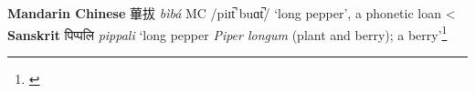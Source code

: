 \begin{etymology}\label{ety:biba}
\textbf{Mandarin Chinese} {蓽拔} \textit{bìbá} MC /piɪt̚  buɑt̚/ `long pepper', a phonetic loan
< \textbf{Sanskrit} {पिप्पलि } \textit{pippali} `long pepper \textit{Piper longum} (plant and berry); a berry'\footnote{\textcite[626]{monier-williams_sanskrit-english_1899}}
\end{etymology}